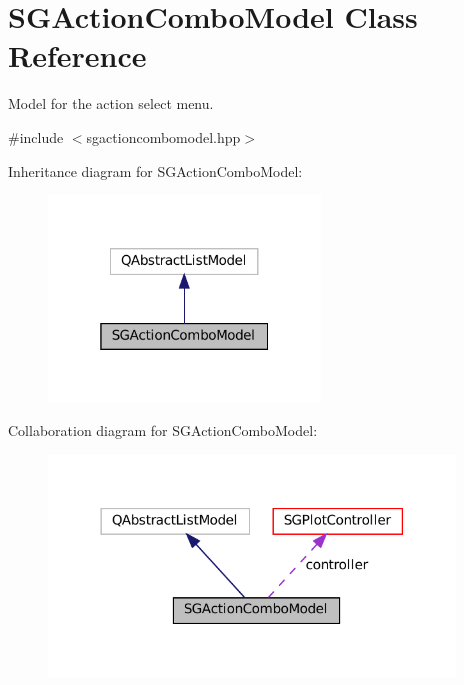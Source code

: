 \hypertarget{classSGActionComboModel}{}\section{S\+G\+Action\+Combo\+Model Class Reference}
\label{classSGActionComboModel}


Model for the action select menu.  




{\ttfamily \#include $<$sgactioncombomodel.\+hpp$>$}



Inheritance diagram for S\+G\+Action\+Combo\+Model\+:
\nopagebreak
\begin{figure}[H]
\begin{center}
\leavevmode
\includegraphics[width=205pt]{classSGActionComboModel__inherit__graph}
\end{center}
\end{figure}


Collaboration diagram for S\+G\+Action\+Combo\+Model\+:
\nopagebreak
\begin{figure}[H]
\begin{center}
\leavevmode
\includegraphics[width=306pt]{classSGActionComboModel__coll__graph}
\end{center}
\end{figure}
